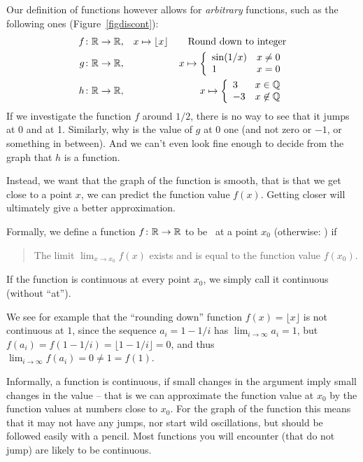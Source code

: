 Our definition of functions however allows for {\em arbitrary} functions, such as the
following ones (Figure~\ref{figdiscont}):
\begin{eqnarray*}
f\colon{\mathbb R}\to{\mathbb R}&,& x\mapsto \lfloor x\rfloor\qquad\mbox{Round down to integer}\\
g\colon{\mathbb R}\to{\mathbb R}&,& x\mapsto 
\left\{\begin{array}{ll}
\sin(1/x)&x\not=0\\
1&x=0\\
\end{array}
\right.\\
h\colon{\mathbb R}\to{\mathbb R}&,& x\mapsto 
\left\{\begin{array}{ll}
3&x\in{\mathbb Q}\\
-3&x\not\in{\mathbb Q}\\
\end{array}
\right.
\end{eqnarray*}
If we investigate the function $f$ around $1/2$, there is no way to see that it jumps at
0 and at 1. Similarly, why is the value of $g$ at $0$ one (and not zero or $-1$, or
something in between). And we can't even look fine enough to decide from the graph that
$h$ is a function.

Instead, we want that the graph of the function is smooth, that is that we get close to
a point $x$, we can predict the function value $f(x)$. Getting closer will ultimately
give a better approximation.

Formally, we define a function $f\colon{\mathbb R}\to{\mathbb R}$ to be~ at a point $x_0$
(otherwise: ) if
\begin{quote}
The limit $\displaystyle\lim_{x\to x_0} f(x)$ exists and is equal to the
function value $f(x_0)$.
\end{quote}

If the function is continuous at every point $x_0$, we simply call it continuous (without
``at'').

We see for example that the ``rounding down'' 
function $f(x)=\lfloor x\rfloor$  is not continuous at $1$,
since the sequence $a_i=1-1/i$ has $\lim_{i\to\infty} a_i=1$, but
$f(a_i)=f(1-1/i)=\lfloor 1-1/i\rfloor=0$, and thus $\lim_{i\to\infty}
f(a_i)=0\not=1=f(1)$.
\medskip

Informally, a function is continuous, if small changes in the argument imply small
changes in the value -- that is we can approximate the function value at $x_0$ by the 
function values at numbers close to $x_0$. For the graph of the function
this means that it may not have any jumps, nor start wild oscillations, but
should be followed easily with a pencil. Most functions you will encounter
(that do not jump) are likely to be continuous.

